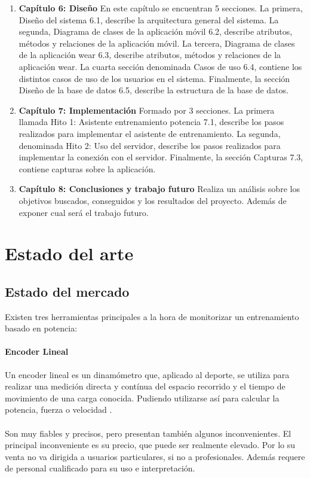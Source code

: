 \begin{enumerate}
	\item \textbf{Capítulo 6: Diseño} En este capítulo se encuentran 5 secciones. La primera, Diseño del sistema 6.1, describe la arquitectura general del sistema. La segunda, Diagrama de clases de la aplicación móvil 6.2, describe atributos, métodos y relaciones de la aplicación móvil. La tercera, Diagrama de clases de la aplicación wear 6.3, describe atributos, métodos y relaciones de la aplicación wear. La cuarta sección denominada Casos de uso 6.4, contiene los distintos casos de uso de los usuarios en el sistema. Finalmente, la sección Diseño de la base de datos 6.5, describe la estructura de la base de datos.
	\item \textbf{Capítulo 7: Implementación} Formado por 3 secciones. La primera llamada Hito 1: Asistente entrenamiento potencia 7.1, describe los pasos realizados para implementar el asistente de entrenamiento. La segunda, denominada Hito 2: Uso del servidor, describe los pasos realizados para implementar la conexión con el servidor. Finalmente, la sección Capturas 7.3, contiene capturas sobre la aplicación.
	\item \textbf{Capítulo 8: Conclusiones y trabajo futuro} Realiza un análisis sobre los objetivos buscados, conseguidos y los resultados del proyecto. Además de exponer cual será el trabajo futuro.
\end{enumerate}

\chapter{Estado del arte}

\section{Estado del mercado}

Existen tres herramientas principales a la hora de monitorizar un entrenamiento basado en potencia:

\subsubsection*{Encoder Lineal}

Un encoder lineal es un dinamómetro que, aplicado al deporte, se utiliza para realizar una medición directa y contínua del espacio recorrido y el tiempo de movimiento de una carga conocida. Pudiendo utilizarse así para calcular la potencia, fuerza o velocidad \cite{encoder}.
\\
\\
Son muy fiables y precisos, pero presentan también algunos inconvenientes. El principal inconveniente es su precio, que puede ser realmente elevado. Por lo su venta no va dirigida a usuarios particulares, si no a profesionales. Además requere de personal cualificado para su uso e interpretación.

